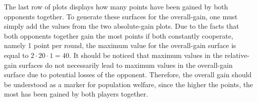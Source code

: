 \documentclass[11pt]{article}
\begin{document}
The last row of plots displays how many points have been gained by both opponents together. 
To generate these surfaces for the overall-gain, one must simply add the values from the two absolute-gain plots. 
Due to the facts that both opponents together gain the most points if both constantly cooperate, namely 1 point per round, the maximum value for the overall-gain surface is equal to $2 \cdot 20 \cdot 1 = 40$.
It should be noticed that maximum values in the relative-gain surfaces do not necessarily lead to maximum values in the overall-gain surface due to potential losses of the opponent. 
Therefore, the overall gain should be understood as a marker for population welfare, since the higher the points, the most has been gained by both players together.

\end{document}
